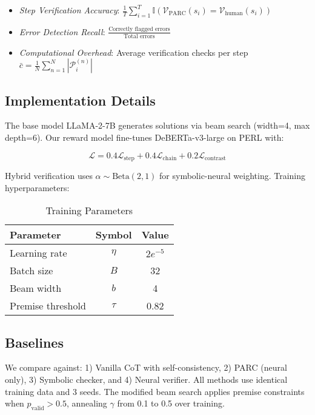 \documentclass{article}
\begin{document}
\begin{itemize}
\item \textit{Step Verification Accuracy}: $\frac{1}{T}\sum_{i=1}^T \mathbb{I}(\mathcal{V}_{\text{PARC}}(s_i) = \mathcal{V}_{\text{human}}(s_i))$
\item \textit{Error Detection Recall}: $\frac{\text{Correctly flagged errors}}{\text{Total errors}}$
\item \textit{Computational Overhead}: Average verification checks per step $\bar{c} = \frac{1}{N}\sum_{n=1}^N |\mathcal{P}_i^{(n)}|$
\end{itemize}

\subsection*{Implementation Details}
The base model LLaMA-2-7B generates solutions via beam search (width=4, max depth=6). Our reward model fine-tunes DeBERTa-v3-large on PERL with:

\begin{equation}
\mathcal{L} = 0.4\mathcal{L}_{\text{step}} + 0.4\mathcal{L}_{\text{chain}} + 0.2\mathcal{L}_{\text{contrast}}
\end{equation}

Hybrid verification uses $\alpha \sim \text{Beta}(2,1)$ for symbolic-neural weighting. Training hyperparameters:

\begin{table}[h]
\centering
\caption{Training Parameters}
\begin{tabular}{lcc}
Parameter & Symbol & Value \\
\hline
Learning rate & $\eta$ & $2e^{-5}$ \\
Batch size & $B$ & 32 \\
Beam width & $b$ & 4 \\
Premise threshold & $\tau$ & 0.82 \\
\end{tabular}
\end{table}

\subsection*{Baselines}
We compare against: 1) Vanilla CoT with self-consistency, 2) PARC (neural only), 3) Symbolic checker, and 4) Neural verifier. All methods use identical training data and 3 seeds. The modified beam search applies premise constraints when $p_{\text{valid}} > 0.5$, annealing $\gamma$ from 0.1 to 0.5 over training.
\end{document}
